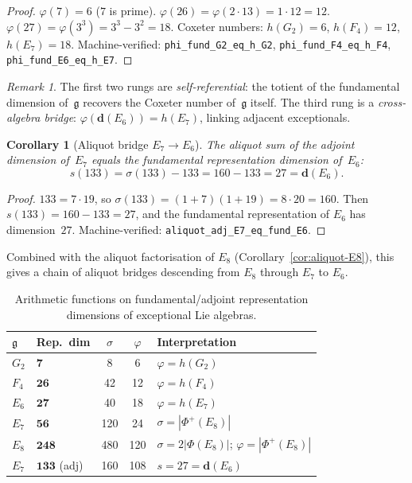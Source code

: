 \documentclass[11pt]{amsart}
\theoremstyle{plain}
\newtheorem{corollary}[theorem]{Corollary}
\theoremstyle{definition}
\theoremstyle{remark}
\newtheorem{remark}[theorem]{Remark}
\newcommand{\fg}{\mathfrak{g}}
\renewcommand{\Phi}{\varPhi}
\begin{document}
\begin{proof}
$\varphi(7) = 6$ ($7$ is prime).
$\varphi(26) = \varphi(2 \cdot 13) = 1 \cdot 12 = 12$.
$\varphi(27) = \varphi(3^3) = 3^3 - 3^2 = 18$.
Coxeter numbers: $h(G_2) = 6$, $h(F_4) = 12$, $h(E_7) = 18$.
Machine-verified: \texttt{phi\_fund\_G2\_eq\_h\_G2},
\texttt{phi\_fund\_F4\_eq\_h\_F4},
\texttt{phi\_fund\_E6\_eq\_h\_E7}.
\end{proof}

\begin{remark}
The first two rungs are \emph{self-referential}: the totient of the
fundamental dimension of~$\fg$ recovers the Coxeter number of~$\fg$
itself.  The third rung is a \emph{cross-algebra bridge}:
$\varphi(\mathbf{d}(E_6)) = h(E_7)$, linking adjacent exceptionals.
\end{remark}

\begin{corollary}[Aliquot bridge $E_7 \to E_6$]\label{cor:aliquot-E7-E6}
The aliquot sum of the adjoint dimension of~$E_7$ equals the fundamental
representation dimension of~$E_6$:
\[
  s(133) = \sigma(133) - 133 = 160 - 133 = 27 = \mathbf{d}(E_6).
\]
\end{corollary}

\begin{proof}
$133 = 7 \cdot 19$, so $\sigma(133) = (1+7)(1+19) = 8 \cdot 20 = 160$.
Then $s(133) = 160 - 133 = 27$, and the fundamental representation of
$E_6$ has dimension~$27$.
Machine-verified: \texttt{aliquot\_adj\_E7\_eq\_fund\_E6}.
\end{proof}

Combined with the aliquot factorisation of $E_8$
(Corollary~\ref{cor:aliquot-E8}), this gives a chain of aliquot bridges
descending from $E_8$ through $E_7$ to $E_6$.

\begin{table}[ht]
\centering
\caption{Arithmetic functions on fundamental/adjoint representation
  dimensions of exceptional Lie algebras.}\label{tab:rep-dims}
\begin{tabular}{@{}llccl@{}}
\toprule
$\fg$ & Rep.\ dim & $\sigma$ & $\varphi$ & Interpretation \\
\midrule
$G_2$  & $\mathbf{7}$   & 8       & 6   & $\varphi = h(G_2)$ \\
$F_4$  & $\mathbf{26}$  & 42      & 12  & $\varphi = h(F_4)$ \\
$E_6$  & $\mathbf{27}$  & 40      & 18  & $\varphi = h(E_7)$ \\
$E_7$  & $\mathbf{56}$  & 120     & 24  & $\sigma = |\Phi^+(E_8)|$ \\
$E_8$  & $\mathbf{248}$ & 480     & 120 & $\sigma = 2|\Phi(E_8)|$; $\varphi = |\Phi^+(E_8)|$ \\
\midrule
$E_7$  & $\mathbf{133}$ (adj) & 160 & 108 & $s = 27 = \mathbf{d}(E_6)$ \\
\bottomrule
\end{tabular}
\end{table}
\end{document}
